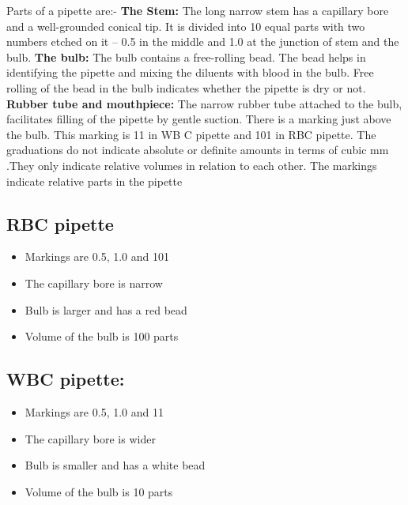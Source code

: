 \documentclass[a4paper,12pt]{book}
\begin{document}
					Parts of a pipette are:-\newline
					\textbf{The Stem:}
					The long narrow stem has a capillary bore and a well-grounded conical tip. It is divided into 10 equal parts with two numbers etched on it – 0.5 in the middle and 1.0 at the junction of stem and the bulb.\newline
					\textbf{The bulb:}
					The bulb contains a free-rolling bead. The bead helps in identifying the pipette and mixing the diluents with blood in the bulb. Free rolling of the bead in the bulb indicates whether the pipette is dry or not.\newline
					\textbf{Rubber tube and mouthpiece:}
					The narrow rubber tube attached to the bulb, facilitates filling of the pipette by gentle suction. There is a marking just above the bulb. This marking is 11 in WB C pipette and 101 in RBC pipette. The graduations do not indicate absolute or definite amounts in terms of cubic mm .They only indicate relative volumes in relation to each other. The markings indicate relative parts in the pipette\newline

					\subsection*{RBC pipette}
					\begin{itemize}

						\item{Markings are 0.5, 1.0 and 101}
						\item{The capillary bore is narrow}
						\item{Bulb is larger and has a red bead}
						\item{Volume of the bulb is 100 parts}
					\end{itemize}

					\subsection*{WBC pipette:}
					\begin{itemize}
						\item{Markings are 0.5, 1.0 and 11}
						\item{The capillary bore is wider}
						\item{Bulb is smaller and has a white bead}
						\item{Volume of the bulb is 10 parts}
					\end{itemize}
\end{document}
